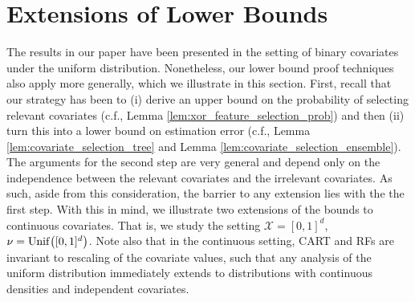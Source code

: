 \documentclass[11pt]{article}
\DeclarePairedDelimiter{\braces}{\lbrace}{\rbrace}
\DeclarePairedDelimiter{\paren}{(}{)}
\DeclarePairedDelimiter{\abs}{|}{|}
\newcommand{\R}{\mathbb{R}}
\renewcommand{\xspace}{\mathcal{X}}
\newcommand{\ctsspace}{[0,1]^\nfeats}
\newcommand{\xmeasure}{\nu}
\newcommand{\nfeats}{d}
\begin{document}



\section{Extensions of Lower Bounds}
\label{sec:extensions}

The results in our paper have been presented in the setting of binary covariates under the uniform distribution.
Nonetheless, our lower bound proof techniques also apply more generally, which we illustrate in this section.
First, recall that our strategy has been to (i) derive an upper bound on the probability of selecting relevant covariates (c.f., Lemma \ref{lem:xor_feature_selection_prob}) and then (ii) turn this into a lower bound on estimation error (c.f., Lemma \ref{lem:covariate_selection_tree} and Lemma \ref{lem:covariate_selection_ensemble}).
The arguments for the second step are very general and depend only on the independence between the relevant covariates and the irrelevant covariates.
As such, aside from this consideration, the barrier to any extension lies with the the first step.
With this in mind, we illustrate two extensions of the bounds to continuous covariates.
That is, we study the setting $\xspace = \ctsspace$, $\xmeasure = \operatorname{Unif}\paren*{\ctsspace}$.
Note also that in the continuous setting, CART and RFs are invariant to rescaling of the covariate values, such that any analysis of the uniform distribution immediately extends to distributions with continuous densities and independent covariates.
\end{document}
